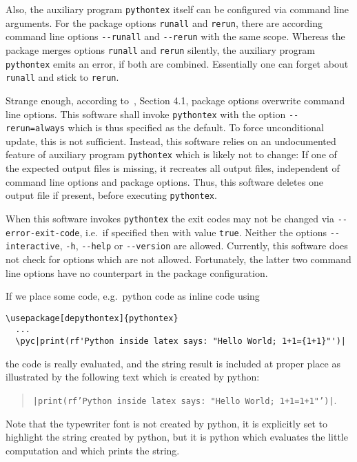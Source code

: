 Also, the auxiliary program \texttt{pythontex} itself can be configured via command line arguments. 
For the package options \texttt{runall} and \texttt{rerun}, 
there are according command line options \texttt{-{}-runall} and \texttt{-{}-rerun} with the same scope. 
Whereas the package merges options \texttt{runall} and \texttt{rerun} silently, 
the auxiliary program \texttt{pythontex} emits an error, if both are combined. 
Essentially one can forget about \texttt{runall} and stick to \texttt{rerun}. 

Strange enough, according to~\cite{PythonTexP}, Section 4.1, package options overwrite command line options. 
This software shall invoke \texttt{pythontex} 
with the option \texttt{-{}-rerun=always} which is thus specified as the default. 
To force unconditional update, this is not sufficient. 
Instead, this software relies on an undocumented feature of auxiliary program \texttt{pythontex} 
which is likely not to change: 
If one of the expected output files is missing, it recreates all output files, independent of command line options and package options. 
Thus, this software deletes one output file if present, before executing \texttt{pythontex}. 

When this software invokes \texttt{pythontex} 
the exit codes may not be changed via \texttt{-{}-error-exit-code}, 
i.e.~if specified then with value \texttt{true}. 
Neither the options \texttt{-{}-interactive}, \texttt{-h}, \texttt{-{}-help} or \texttt{-{}-version} are allowed. 
Currently, this software does not check for options which are not allowed. 
Fortunately, the latter two command line options have no counterpart in the package configuration. 




If we place some code, e.g.~python code as inline code using 
%
\begin{lstlisting}[basicstyle=\footnotesize]
  \usepackage[depythontex]{pythontex}
  ...
  \pyc|print(rf'Python inside latex says: "Hello World; 1+1={1+1}"')|
\end{lstlisting}
%
the code is really evaluated, and the string result is included at proper place 
as illustrated by the following text which is created by python: 
%
\begin{quote}
  \texttt{\pyc|print(rf'Python inside latex says: "Hello World; 1+1={1+1}"')|}. %
\end{quote}
%
Note that the typewriter font is not created by python, 
it is explicitly set to highlight the string created by python, 
but it is python which evaluates the little computation 
and which prints the string. 

